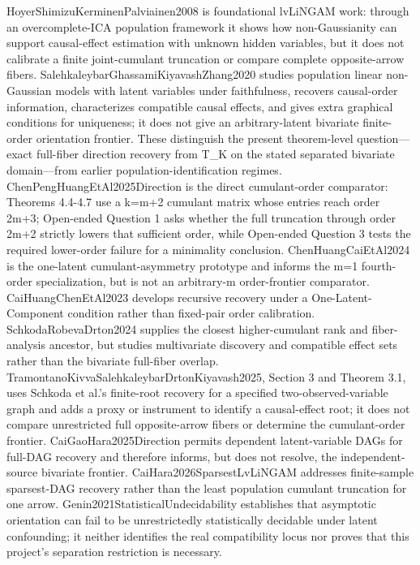 \documentclass{article}
\begin{document}
HoyerShimizuKerminenPalviainen2008 is foundational lvLiNGAM work: through an overcomplete-ICA population framework it shows how non-Gaussianity can support causal-effect estimation with unknown hidden variables, but it does not calibrate a finite joint-cumulant truncation or compare complete opposite-arrow fibers. SalehkaleybarGhassamiKiyavashZhang2020 studies population linear non-Gaussian models with latent variables under faithfulness, recovers causal-order information, characterizes compatible causal effects, and gives extra graphical conditions for uniqueness; it does not give an arbitrary-latent bivariate finite-order orientation frontier. These distinguish the present theorem-level question—exact full-fiber direction recovery from T_K on the stated separated bivariate domain—from earlier population-identification regimes. ChenPengHuangEtAl2025Direction is the direct cumulant-order comparator: Theorems 4.4-4.7 use a k=m+2 cumulant matrix whose entries reach order 2m+3; Open-ended Question 1 asks whether the full truncation through order 2m+2 strictly lowers that sufficient order, while Open-ended Question 3 tests the required lower-order failure for a minimality conclusion. ChenHuangCaiEtAl2024 is the one-latent cumulant-asymmetry prototype and informs the m=1 fourth-order specialization, but is not an arbitrary-m order-frontier comparator. CaiHuangChenEtAl2023 develops recursive recovery under a One-Latent-Component condition rather than fixed-pair order calibration. SchkodaRobevaDrton2024 supplies the closest higher-cumulant rank and fiber-analysis ancestor, but studies multivariate discovery and compatible effect sets rather than the bivariate full-fiber overlap. TramontanoKivvaSalehkaleybarDrtonKiyavash2025, Section 3 and Theorem 3.1, uses Schkoda et al.'s finite-root recovery for a specified two-observed-variable graph and adds a proxy or instrument to identify a causal-effect root; it does not compare unrestricted full opposite-arrow fibers or determine the cumulant-order frontier. CaiGaoHara2025Direction permits dependent latent-variable DAGs for full-DAG recovery and therefore informs, but does not resolve, the independent-source bivariate frontier. CaiHara2026SparsestLvLiNGAM addresses finite-sample sparsest-DAG recovery rather than the least population cumulant truncation for one arrow. Genin2021StatisticalUndecidability establishes that asymptotic orientation can fail to be unrestrictedly statistically decidable under latent confounding; it neither identifies the real compatibility locus nor proves that this project's separation restriction is necessary.
\end{document}
